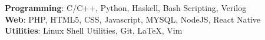 {\Large

\textbf{Programming}: C/C++, Python, Haskell, Bash Scripting, Verilog\\
\vspace{1.5mm}
\textbf{Web}: PHP, HTML5, CSS, Javascript, MYSQL, NodeJS, React Native\\
\vspace{1.5mm}
\textbf{Utilities}: Linux Shell Utilities, Git, \LaTeX, Vim
\vspace{1.5mm}
}
\vspace{3mm}
